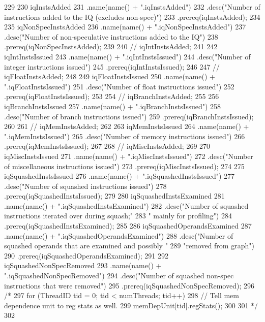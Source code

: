 \begin{DoxyCode}
229 {
230     iqInstsAdded
231         .name(name() + ".iqInstsAdded")
232         .desc("Number of instructions added to the IQ (excludes non-spec)")
233         .prereq(iqInstsAdded);
234 
235     iqNonSpecInstsAdded
236         .name(name() + ".iqNonSpecInstsAdded")
237         .desc("Number of non-speculative instructions added to the IQ")
238         .prereq(iqNonSpecInstsAdded);
239 
240 //    iqIntInstsAdded;
241 
242     iqIntInstsIssued
243         .name(name() + ".iqIntInstsIssued")
244         .desc("Number of integer instructions issued")
245         .prereq(iqIntInstsIssued);
246 
247 //    iqFloatInstsAdded;
248 
249     iqFloatInstsIssued
250         .name(name() + ".iqFloatInstsIssued")
251         .desc("Number of float instructions issued")
252         .prereq(iqFloatInstsIssued);
253 
254 //    iqBranchInstsAdded;
255 
256     iqBranchInstsIssued
257         .name(name() + ".iqBranchInstsIssued")
258         .desc("Number of branch instructions issued")
259         .prereq(iqBranchInstsIssued);
260 
261 //    iqMemInstsAdded;
262 
263     iqMemInstsIssued
264         .name(name() + ".iqMemInstsIssued")
265         .desc("Number of memory instructions issued")
266         .prereq(iqMemInstsIssued);
267 
268 //    iqMiscInstsAdded;
269 
270     iqMiscInstsIssued
271         .name(name() + ".iqMiscInstsIssued")
272         .desc("Number of miscellaneous instructions issued")
273         .prereq(iqMiscInstsIssued);
274 
275     iqSquashedInstsIssued
276         .name(name() + ".iqSquashedInstsIssued")
277         .desc("Number of squashed instructions issued")
278         .prereq(iqSquashedInstsIssued);
279 
280     iqSquashedInstsExamined
281         .name(name() + ".iqSquashedInstsExamined")
282         .desc("Number of squashed instructions iterated over during squash;"
283               " mainly for profiling")
284         .prereq(iqSquashedInstsExamined);
285 
286     iqSquashedOperandsExamined
287         .name(name() + ".iqSquashedOperandsExamined")
288         .desc("Number of squashed operands that are examined and possibly "
289               "removed from graph")
290         .prereq(iqSquashedOperandsExamined);
291 
292     iqSquashedNonSpecRemoved
293         .name(name() + ".iqSquashedNonSpecRemoved")
294         .desc("Number of squashed non-spec instructions that were removed")
295         .prereq(iqSquashedNonSpecRemoved);
296 /*
297     for (ThreadID tid = 0; tid < numThreads; tid++) {
298         // Tell mem dependence unit to reg stats as well.
299         memDepUnit[tid].regStats();
300     }
301 */
302 }
\end{DoxyCode}
